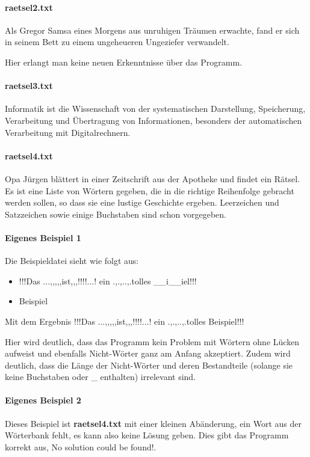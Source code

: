 \documentclass[a4paper,10pt,ngerman]{scrartcl}
\begin{document}
\paragraph{raetsel2.txt}
\glqq Als Gregor Samsa eines Morgens aus unruhigen Träumen erwachte, fand er sich in seinem Bett zu einem ungeheueren Ungeziefer verwandelt.\grqq{}

Hier erlangt man keine neuen Erkenntnisse über das Programm.

\paragraph{raetsel3.txt}
\glqq Informatik ist die Wissenschaft von der systematischen Darstellung, Speicherung, Verarbeitung und Übertragung von Informationen, besonders der automatischen Verarbeitung mit Digitalrechnern.\grqq{}

\paragraph{raetsel4.txt}
\glqq Opa Jürgen blättert in einer Zeitschrift aus der Apotheke und findet ein Rätsel. Es ist eine Liste von Wörtern gegeben, die in die richtige Reihenfolge gebracht werden sollen, so dass sie eine lustige Geschichte ergeben. Leerzeichen und Satzzeichen sowie einige Buchstaben sind schon vorgegeben.\grqq{}

\paragraph{Eigenes Beispiel 1}
Die Beispieldatei sieht wie folgt aus:

\begin{itemize}
    \item[] !!!Das ...,,,,,ist,,,!!!!...! ein .,.,..,.tolles \_\_i\_\_iel!!!
    \item[] Beispiel
\end{itemize}

Mit dem Ergebnis \glqq !!!Das ...,,,,,ist,,,!!!!...! ein .,.,..,.tolles Beispiel!!!\grqq{}

Hier wird deutlich, dass das Programm kein Problem mit Wörtern ohne Lücken aufweist und ebenfalls Nicht-Wörter ganz am Anfang akzeptiert. Zudem wird deutlich, dass die Länge der Nicht-Wörter und deren Bestandteile (solange sie keine Buchstaben oder \glqq \_\grqq{} enthalten) irrelevant sind.

\paragraph{Eigenes Beispiel 2}
Dieses Beispiel ist \textbf{raetsel4.txt} mit einer kleinen Abänderung, ein Wort aus der Wörterbank fehlt, es kann also keine Lösung geben. Dies gibt das Programm korrekt aus, \glqq No solution could be found!\grqq{}.
\end{document}
